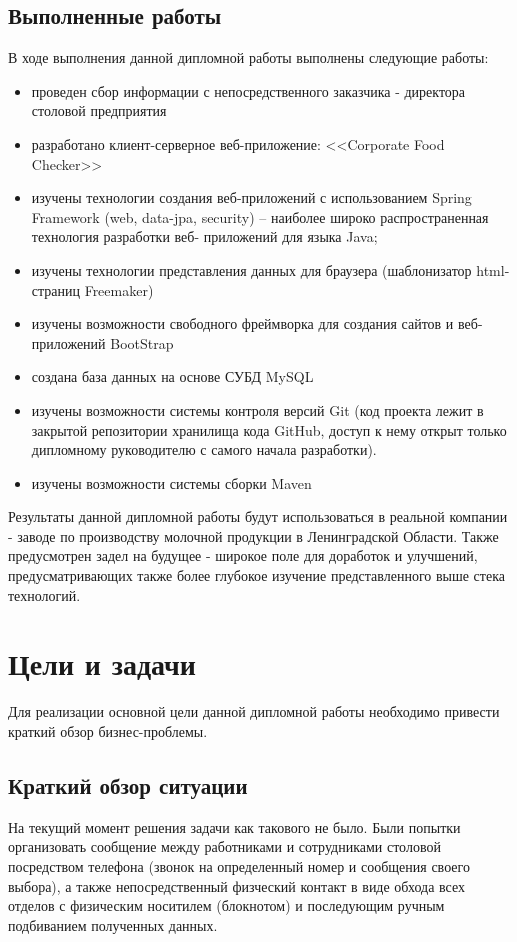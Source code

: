 \documentclass[a4paper]{article}
\begin{document}
\subsection{Выполненные работы}

В ходе выполнения данной дипломной работы выполнены следующие работы:
\begin{itemize}
\setlength{\itemsep}{-2mm}
	\item проведен сбор информации с непосредственного заказчика - директора столовой предприятия
	\item разработано клиент-серверное веб-приложение: <<Corporate Food Checker>>
	\item изучены технологии создания веб-приложений с использованием Spring Framework
(web, data-jpa, security) – наиболее широко распространенная технология разработки веб-
приложений для языка Java;
	\item изучены технологии представления данных для браузера (шаблонизатор html-страниц
Freemaker)
	\item изучены возможности свободного фреймворка для создания сайтов и веб-приложений BootStrap
	\item создана база данных на основе СУБД MySQL 
	\item изучены возможности системы контроля версий Git (код проекта лежит в закрытой репозитории хранилища кода GitHub, доступ к нему открыт только дипломному руководителю с самого начала разработки).
	\item изучены возможности системы сборки Maven
\end{itemize}

Результаты данной дипломной работы будут использоваться в реальной компании - заводе по производству молочной продукции в Ленинградской Области. Также предусмотрен задел на будущее - широкое поле для доработок и улучшений, предусматривающих также более глубокое изучение представленного выше стека технологий.

\section{Цели и задачи}
Для реализации основной цели данной дипломной работы необходимо привести краткий обзор бизнес-проблемы.

\subsection{Краткий обзор ситуации}
На текущий момент решения задачи как такового не было. Были попытки организовать сообщение между работниками и сотрудниками столовой посредством телефона (звонок на определенный номер и сообщения своего выбора), а также непосредственный физческий контакт в виде обхода всех отделов с физическим носитилем (блокнотом) и последующим ручным подбиванием полученных данных.
\end{document}
